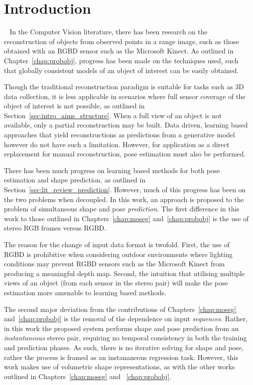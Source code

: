 \label{chap:spp}
\section{Introduction}
~\label{sec:spp_introduction}
In the Computer Vision literature, there has been research on the reconstruction of objects
from observed points in a range image, such as those obtained with an RGBD sensor such 
as the Microsoft Kinect. As outlined in Chapter~\ref{chap:probobj}, progress has been made 
on the techniques used, such that globally consistent models of an object of interest can be 
easily obtained.

Though the traditional reconstruction paradigm is suitable for tasks such as 3D data 
collection, it is less applicable in scenarios where full sensor coverage of the object 
of interest is not possible, as outlined in Section~\ref{sec:intro_aims_structure}. When a full 
view of an object is not available, only a partial reconstruction may be built. Data driven, 
learning based approaches that yield reconstructions as predictions from a generative model 
however do not have such a limitation. However, for application as a direct replacement for 
manual reconstruction, pose estimation must also be performed.

There has been much progress on learning based methods for both pose estimation and 
shape prediction, as outlined in Section~\ref{sec:lit_review_prediction}. However, much of 
this progress has been on the two problems when decoupled. In this work, an approach is 
proposed to the problem of simultaneous shape and pose \textit{prediction}. The first 
difference in this work to those outlined in Chapters~\ref{chap:moseg} and~\ref{chap:probobj} 
is the use of stereo RGB frames versus RGBD\@. 

The reason for the change of input data format is twofold. First, the use of RGBD is prohibitive 
when considering outdoor environments where lighting conditions may prevent RGBD sensors such as the 
Microsoft Kinect from producing a meaningful depth map. Second, the intuition that utilising multiple 
views of an object (from each sensor in the stereo pair) will make the pose estimation more amenable to 
learning based methods.

The second major deviation from the contributions of Chapters~\ref{chap:moseg} and~\ref{chap:probobj} 
is the removal of the dependence on input \textit{sequences}. Rather, in this work 
the proposed system performs shape and pose prediction from an \textit{instantaneous}
stereo pair, requiring no temporal consistency in both the training and prediction 
phases. As such, there is no iterative solving for shape and pose, rather the process 
is framed as an instananeous regression task. However, this work makes use of volumetric
shape representations, as with the other works outlined in Chapters~\ref{chap:moseg} and
~\ref{chap:probobj}.

